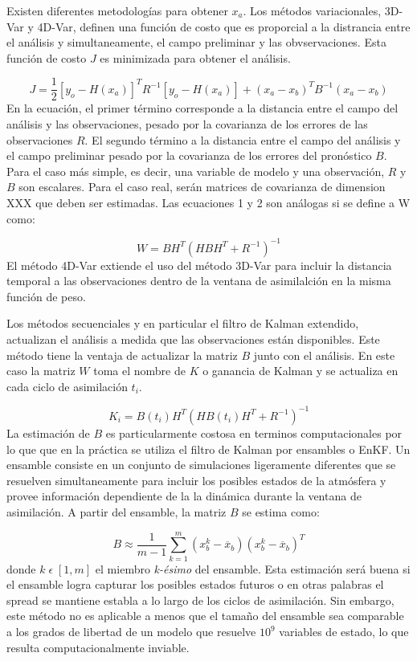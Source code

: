 \documentclass[12pt,twoside]{reedthesis}
\begin{document}
Existen diferentes metodologías para obtener \(x_a\). Los métodos variacionales, 3D-Var y 4D-Var, definen una función de costo que es proporcial a la distrancia entre el análisis y simultaneamente, el campo preliminar y las obvservaciones. Esta función de costo \(J\) es minimizada para obtener el análisis.

\[ J = \frac{1}{2} {[y_o - H (x_a)]^T R^{-1} [y_o - H (x_a)] + (x_a - x_b )^T B^{-1} (x_a - x_b )} \]
En la ecuación, el primer término corresponde a la distancia entre el campo del análisis y las observaciones, pesado por la covarianza de los errores de las observaciones \(R\). El segundo término a la distancia entre el campo del análisis y el campo preliminar pesado por la covarianza de los errores del pronóstico \(B\). Para el caso más simple, es decir, una variable de modelo y una observación, \(R\) y \(B\) son escalares. Para el caso real, serán matrices de covarianza de dimension XXX que deben ser estimadas. Las ecuaciones 1 y 2 son análogas si se define a W como:

\[ W = BH^T (HBH^T + R^{-1})^{-1} \]
El método 4D-Var extiende el uso del método 3D-Var para incluir la distancia temporal a las observaciones dentro de la ventana de asimilalción en la misma función de peso.

Los métodos secuenciales y en particular el filtro de Kalman extendido, actualizan el análisis a medida que las observaciones están disponibles. Este método tiene la ventaja de actualizar la matriz \(B\) junto con el análisis. En este caso la matriz \(W\) toma el nombre de \(K\) o ganancia de Kalman y se actualiza en cada ciclo de asimilación \(t_i\).

\[ K_i = B(t_i) H^T (HB(t_i)H^T + R^{-1})^{-1}\]
La estimación de \(B\) es particularmente costosa en terminos computacionales por lo que que en la práctica se utiliza el filtro de Kalman por ensambles o EnKF. Un ensamble consiste en un conjunto de simulaciones ligeramente diferentes que se resuelven simultaneamente para incluir los posibles estados de la atmósfera y provee información dependiente de la la dinámica durante la ventana de asimilación. A partir del ensamble, la matriz \(B\) se estima como:

\[ B \approx \frac{1}{m-1} \sum_{k=1}^{m}(x_{b}^{k}-\overline{x}_b)(x_{b}^{k}-\overline{x}_b)^T\]
donde \(k \; \epsilon \; [1,m]\) el miembro \emph{k-ésimo} del ensamble. Esta estimación será buena si el ensamble logra capturar los posibles estados futuros o en otras palabras el spread se mantiene establa a lo largo de los ciclos de asimilación. Sin embargo, este método no es aplicable a menos que el tamaño del ensamble sea comparable a los grados de libertad de un modelo que resuelve \(10^9\) variables de estado, lo que resulta computacionalmente inviable.
\end{document}
